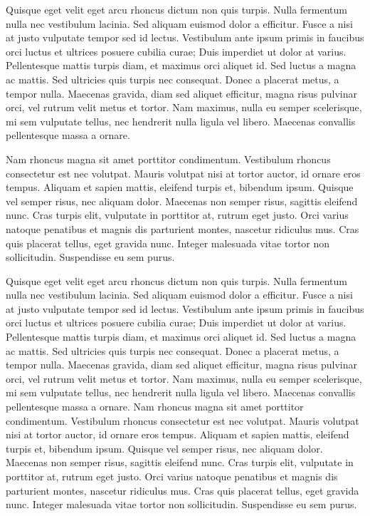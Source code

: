 \documentclass[a4paper]{article}
\begin{document}
    \begin{answer}
        Quisque eget velit eget arcu rhoncus dictum non quis turpis. Nulla fermentum nulla nec vestibulum lacinia. Sed aliquam euismod dolor a efficitur. Fusce a nisi at justo vulputate tempor sed id lectus. Vestibulum ante ipsum primis in faucibus orci luctus et ultrices posuere cubilia curae; Duis imperdiet ut dolor at varius. Pellentesque mattis turpis diam, et maximus orci aliquet id. Sed luctus a magna ac mattis. Sed ultricies quis turpis nec consequat. Donec a placerat metus, a tempor nulla. Maecenas gravida, diam sed aliquet efficitur, magna risus pulvinar orci, vel rutrum velit metus et tortor. Nam maximus, nulla eu semper scelerisque, mi sem vulputate tellus, nec hendrerit nulla ligula vel libero. Maecenas convallis pellentesque massa a ornare.

        Nam rhoncus magna sit amet porttitor condimentum. Vestibulum rhoncus consectetur est nec volutpat. Mauris volutpat nisi at tortor auctor, id ornare eros tempus. Aliquam et sapien mattis, eleifend turpis et, bibendum ipsum. Quisque vel semper risus, nec aliquam dolor. Maecenas non semper risus, sagittis eleifend nunc. Cras turpis elit, vulputate in porttitor at, rutrum eget justo. Orci varius natoque penatibus et magnis dis parturient montes, nascetur ridiculus mus. Cras quis placerat tellus, eget gravida nunc. Integer malesuada vitae tortor non sollicitudin. Suspendisse eu sem purus.
    \end{answer}

    \begin{answer}
        Quisque eget velit eget arcu rhoncus dictum non quis turpis. Nulla fermentum nulla nec vestibulum lacinia. Sed aliquam euismod dolor a efficitur. Fusce a nisi at justo vulputate tempor sed id lectus. Vestibulum ante ipsum primis in faucibus orci luctus et ultrices posuere cubilia curae; Duis imperdiet ut dolor at varius. Pellentesque mattis turpis diam, et maximus orci aliquet id. Sed luctus a magna ac mattis. Sed ultricies quis turpis nec consequat. Donec a placerat metus, a tempor nulla. Maecenas gravida, diam sed aliquet efficitur, magna risus pulvinar orci, vel rutrum velit metus et tortor. Nam maximus, nulla eu semper scelerisque, mi sem vulputate tellus, nec hendrerit nulla ligula vel libero. Maecenas convallis pellentesque massa a ornare.
        Nam rhoncus magna sit amet porttitor condimentum. Vestibulum rhoncus
         consectetur est nec volutpat. Mauris volutpat nisi at tortor auctor, id 
         ornare eros tempus. Aliquam et sapien mattis, eleifend turpis et, bibendum ipsum. Quisque vel semper risus, nec aliquam dolor. Maecenas non semper risus, sagittis eleifend nunc. Cras turpis elit, vulputate in porttitor at, rutrum eget justo. Orci varius natoque penatibus et magnis dis parturient montes, nascetur ridiculus mus. Cras quis placerat tellus, eget gravida nunc. Integer malesuada vitae tortor non sollicitudin. Suspendisse eu sem purus.
    \end{answer}
\end{document}
